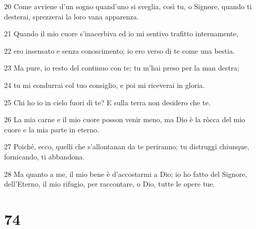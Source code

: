 \par 20 Come avviene d'un sogno quand'uno si sveglia, così tu, o Signore, quando ti desterai, sprezzerai la loro vana apparenza.
\par 21 Quando il mio cuore s'inacerbiva ed io mi sentivo trafitto internamente,
\par 22 ero insensato e senza conoscimento; io ero verso di te come una bestia.
\par 23 Ma pure, io resto del continuo con te; tu m'hai preso per la man destra;
\par 24 tu mi condurrai col tuo consiglio, e poi mi riceverai in gloria.
\par 25 Chi ho io in cielo fuori di te? E sulla terra non desidero che te.
\par 26 La mia carne e il mio cuore posson venir meno, ma Dio è la ròcca del mio cuore e la mia parte in eterno.
\par 27 Poiché, ecco, quelli che s'allontanan da te periranno; tu distruggi chiunque, fornicando, ti abbandona.
\par 28 Ma quanto a me, il mio bene è d'accostarmi a Dio; io ho fatto del Signore, dell'Eterno, il mio rifugio, per raccontare, o Dio, tutte le opere tue.

\chapter{74}

